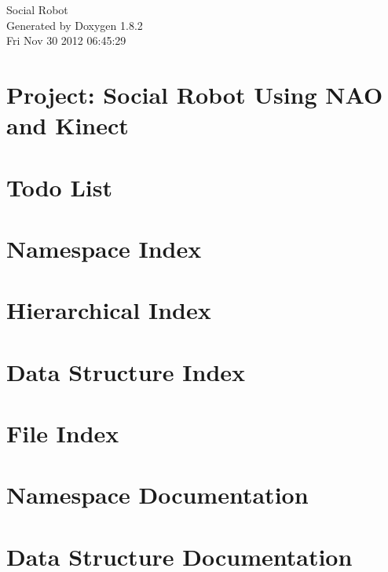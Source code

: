 \documentclass{book}
\begin{document}
\hypersetup{pageanchor=false,citecolor=blue}
\begin{titlepage}
\vspace*{7cm}
\begin{center}
{\Large Social Robot }\\
\vspace*{1cm}
{\large Generated by Doxygen 1.8.2}\\
\vspace*{0.5cm}
{\small Fri Nov 30 2012 06:45:29}\\
\end{center}
\end{titlepage}
\clearemptydoublepage
{}
\tableofcontents
\clearemptydoublepage
{}
\hypersetup{pageanchor=true,citecolor=blue}
\chapter{Project\-: Social Robot Using N\-A\-O and Kinect}
\label{index}\hypertarget{index}{}
\chapter{Todo List}
\label{todo}
\hypertarget{todo}{}

\chapter{Namespace Index}

\chapter{Hierarchical Index}

\chapter{Data Structure Index}

\chapter{File Index}

\chapter{Namespace Documentation}



\chapter{Data Structure Documentation}
























\end{document}
